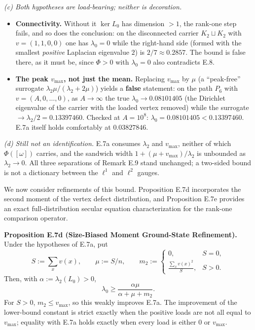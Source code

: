 \documentclass[
]{article}
\providecommand{\tightlist}{%
  \setlength{\itemsep}{0pt}\setlength{\parskip}{0pt}}
\providecommand{\tightlist}{%
  \setlength{\itemsep}{0pt}\setlength{\parskip}{0pt}}
\begin{document}
\emph{(c) Both hypotheses are load-bearing; neither is decoration.}

\begin{itemize}
\tightlist
\item
  \textbf{Connectivity.} Without it \(\ker L_0\) has dimension \(>1\), the rank-one step fails, and so does the conclusion: on the disconnected carrier \(K_2 \sqcup K_2\) with \(v = (1,1,0,0)\) one has \(\lambda_0 = 0\) while the right-hand side (formed with the smallest \emph{positive} Laplacian eigenvalue \(2\)) is \(2/7 \approx 0.2857\). The bound is false there, as it must be, since \(\Phi>0\) with \(\lambda_0=0\) also contradicts E.8.
\item
  \textbf{The peak \(v_{\max}\), not just the mean.} Replacing \(v_{\max}\) by \(\mu\) (a ``peak-free'' surrogate \(\lambda_2\mu/(\lambda_2+2\mu)\)) yields a \textbf{false} statement: on the path \(P_6\) with \(v = (A,0,\dots,0)\), as \(A \to \infty\) the true \(\lambda_0 \to 0.08101405\) (the Dirichlet eigenvalue of the carrier with the loaded vertex removed) while the surrogate \(\to \lambda_2/2 = 0.13397460\). Checked at \(A = 10^{8}\): \(\lambda_0 = 0.08101405 < 0.13397460\). E.7a itself holds comfortably at \(0.03827846\).
\end{itemize}

\emph{(d) Still not an identification.} E.7a consumes \(\lambda_2\) and \(v_{\max}\), neither of which \(\Phi([\omega])\) carries, and the sandwich width \(1+(\mu+v_{\max})/\lambda_2\) is unbounded as \(\lambda_2 \to 0\). All three separations of Remark E.9 stand unchanged; a two-sided bound is not a dictionary between the \(\ell^1\) and \(\ell^2\) gauges.

We now consider refinements of this bound. Proposition E.7d incorporates the second moment of the vertex defect distribution, and Proposition E.7e provides an exact full-distribution secular equation characterization for the rank-one comparison operator.

\textbf{Proposition E.7d (Size-Biased Moment Ground-State Refinement).} Under the hypotheses of E.7a, put
\[S:=\sum_xv(x),\qquad \mu:=S/n,\qquad
m_2:=\begin{cases}0,&S=0,\\[1mm]\displaystyle\frac{\sum_xv(x)^2}{S},&S>0.\end{cases}\]
Then, with \(\alpha:=\lambda_2(L_0)>0\),
\[\lambda_0\ge\frac{\alpha\mu}{\alpha+\mu+m_2}.\]
For \(S>0\), \(m_2\le v_{\max}\), so this weakly improves E.7a. The
improvement of the lower-bound constant is strict exactly when the positive
loads are not all equal to \(v_{\max}\); equality with E.7a holds exactly when
every load is either \(0\) or \(v_{\max}\).
\end{document}
